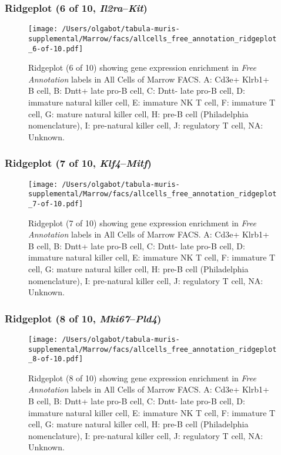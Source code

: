 \clearpage

\subsubsection{Ridgeplot (6 of 10, \emph{Il2ra}--\emph{Kit})}
\begin{figure}[h]
\centering
\texttt{[image: /Users/olgabot/tabula-muris-supplemental/Marrow/facs/allcells\_free\_annotation\_ridgeplot\_6-of-10.pdf]}

\caption{ Ridgeplot (6 of 10)  showing gene expression enrichment in \emph{Free Annotation} labels in All Cells of Marrow FACS. A: Cd3e+ Klrb1+ B cell, B: Dntt+ late pro-B cell, C: Dntt- late pro-B cell, D: immature natural killer cell, E: immature NK T cell, F: immature T cell, G: mature natural killer cell, H: pre-B cell (Philadelphia nomenclature), I: pre-natural killer cell, J: regulatory T cell, NA: Unknown.}
\end{figure}


\clearpage

\subsubsection{Ridgeplot (7 of 10, \emph{Klf4}--\emph{Mitf})}
\begin{figure}[h]
\centering
\texttt{[image: /Users/olgabot/tabula-muris-supplemental/Marrow/facs/allcells\_free\_annotation\_ridgeplot\_7-of-10.pdf]}

\caption{ Ridgeplot (7 of 10)  showing gene expression enrichment in \emph{Free Annotation} labels in All Cells of Marrow FACS. A: Cd3e+ Klrb1+ B cell, B: Dntt+ late pro-B cell, C: Dntt- late pro-B cell, D: immature natural killer cell, E: immature NK T cell, F: immature T cell, G: mature natural killer cell, H: pre-B cell (Philadelphia nomenclature), I: pre-natural killer cell, J: regulatory T cell, NA: Unknown.}
\end{figure}


\clearpage

\subsubsection{Ridgeplot (8 of 10, \emph{Mki67}--\emph{Pld4})}
\begin{figure}[h]
\centering
\texttt{[image: /Users/olgabot/tabula-muris-supplemental/Marrow/facs/allcells\_free\_annotation\_ridgeplot\_8-of-10.pdf]}

\caption{ Ridgeplot (8 of 10)  showing gene expression enrichment in \emph{Free Annotation} labels in All Cells of Marrow FACS. A: Cd3e+ Klrb1+ B cell, B: Dntt+ late pro-B cell, C: Dntt- late pro-B cell, D: immature natural killer cell, E: immature NK T cell, F: immature T cell, G: mature natural killer cell, H: pre-B cell (Philadelphia nomenclature), I: pre-natural killer cell, J: regulatory T cell, NA: Unknown.}
\end{figure}


